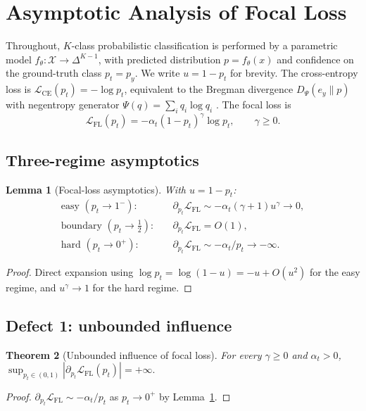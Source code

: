 \documentclass[conference]{IEEEtran}
\newtheorem{theorem}{Theorem}
\newtheorem{lemma}[theorem]{Lemma}
\theoremstyle{definition}
\newcommand{\LCE}{\mathcal{L}_{\mathrm{CE}}}
\newcommand{\LFL}{\mathcal{L}_{\mathrm{FL}}}
\newcommand{\BD}{D_{\Psi}}
\begin{document}
\section{Asymptotic Analysis of Focal Loss}
\label{sec:fl-defects}

Throughout, $K$-class probabilistic classification is performed by a parametric model $f_\theta : \mathcal{X} \to \Delta^{K-1}$, with predicted distribution $p = f_\theta(x)$ and confidence on the ground-truth class $p_t = p_y$. We write $u = 1 - p_t$ for brevity. The cross-entropy loss is $\LCE(p_t) = -\log p_t$, equivalent to the Bregman divergence $\BD(e_y \| p)$ with negentropy generator $\Psi(q) = \sum_i q_i \log q_i$ \cite{banerjee2005bregman}. The focal loss \cite{lin2017focal} is
\begin{equation}
\LFL(p_t) = -\alpha_t (1-p_t)^\gamma \log p_t, \qquad \gamma \ge 0.
\label{eq:fl}
\end{equation}

\subsection{Three-regime asymptotics}
\begin{lemma}[Focal-loss asymptotics]\label{lem:fl-asymp}
With $u = 1 - p_t$:
\begin{align*}
\text{easy } (p_t \to 1^-): & \quad \partial_{p_t}\LFL \sim -\alpha_t(\gamma+1) u^\gamma \to 0,\\
\text{boundary } (p_t \to \tfrac{1}{2}): & \quad \partial_{p_t}\LFL = O(1),\\
\text{hard } (p_t \to 0^+): & \quad \partial_{p_t}\LFL \sim -\alpha_t/p_t \to -\infty.
\end{align*}
\end{lemma}
\begin{proof}
Direct expansion using $\log p_t = \log(1-u) = -u + O(u^2)$ for the easy regime, and $u^\gamma \to 1$ for the hard regime.
\end{proof}

\subsection{Defect 1: unbounded influence}
\begin{theorem}[Unbounded influence of focal loss]\label{thm:fl-unbounded}
For every $\gamma \ge 0$ and $\alpha_t > 0$,
\(
\sup_{p_t \in (0,1)} |\partial_{p_t}\LFL(p_t)| = +\infty.
\)
\end{theorem}
\begin{proof}
$\partial_{p_t}\LFL \sim -\alpha_t/p_t$ as $p_t \to 0^+$ by Lemma~\ref{lem:fl-asymp}.
\end{proof}
\end{document}
